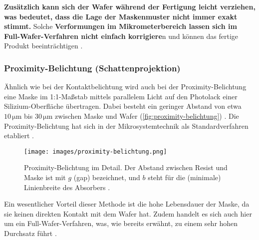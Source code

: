 \documentclass{article} %
\begin{document}
\vspace{1em}

\textbf{Zusätzlich kann sich der Wafer während der Fertigung leicht verziehen, was bedeutet, dass die Lage der Maskenmuster nicht immer exakt stimmt.} Solche \textbf{Verformungen im Mikrometerbereich lassen sich im Full-Wafer-Verfahren nicht einfach korrigiere}n und können das fertige Produkt beeinträchtigen \cite{schmid2024}.





\vspace{1em}

\subsubsection{Proximity-Belichtung (Schattenprojektion)}

Ähnlich wie bei der Kontaktbelichtung wird auch bei der Proximity-Belichtung eine Maske im 1:1-Maßstab mittels parallelem Licht auf den Photolack einer Silizium-Oberfläche übertragen. Dabei besteht ein geringer Abstand von etwa $10 \, \mathrm{\mu m}$ bis $30 \, \mathrm{\mu m}$ zwischen Maske und Wafer (\autoref{fig:proximity-belichtung}) \cite{Mescheder2004}. Die Proximity-Belichtung hat sich in der Mikrosystemtechnik als Standardverfahren etabliert \cite{schmid2024}.

\begin{figure}[htb!]
    \centering
    \texttt{[image: images/proximity-belichtung.png]} %
    \captionsetup{labelfont=bf, width=.5\textwidth} %
    \caption{Proximity-Belichtung im Detail. Der Abstand zwischen Resist und Maske ist mit \( g \) (gap) bezeichnet, und \( b \) steht für die (minimale) Linienbreite des Absorbers \cite{schmid2024}.}
    \label{fig:proximity-belichtung}
\end{figure}

\vspace{1em}

Ein wesentlicher Vorteil dieser Methode ist die hohe Lebensdauer der Maske, da sie keinen direkten Kontakt mit dem Wafer hat. Zudem handelt es sich auch hier um ein Full-Wafer-Verfahren, was, wie bereits erwähnt, zu einem sehr hohen Durchsatz führt \cite{schmid2024}.

\vspace{1em}
\end{document}
